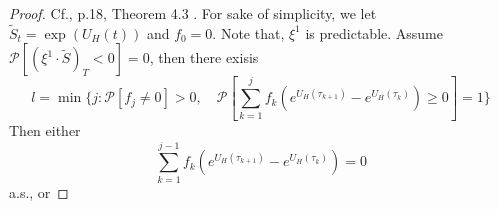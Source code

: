 \documentclass[a4paper, twoside, 11pt]{article}
\theoremstyle{definition}
\newcommand{\brkt}[1]{\left({#1} \right)}
\begin{document}
\begin{proof}
  Cf.\cite{chridito}, p.18, Theorem 4.3 . For sake of simplicity, we let $\tilde{S}_t = \exp\brkt{ U_H(t)}$ and $f_0=0$. Note that, $\xi^1$ is predictable. %
  Assume ${\mathcal{P}}[(\xi^1 \cdot \tilde{S})_T < 0] = 0$, then there exisis 
  $$
  l = \min \{ j: \mathcal{P}[f_j \neq 0] > 0,\hspace{1em} \mathcal{P}[\sum_{k=1}^{j} f_k (e^{U_H(\tau_{k+1})} - e^{U_H(\tau_k)})\ge 0]=1 \}
  $$
  Then either 
	$$
	\sum_{k=1}^{j-1} f_k (e^{U_H(\tau_{k+1})} - e^{U_H(\tau_k)}) = 0
	$$
	a.s., or 


\end{proof}
\end{document}

